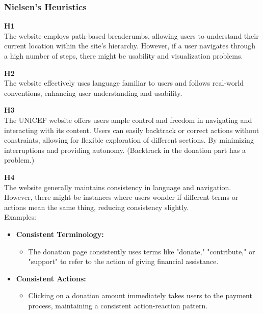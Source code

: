 \documentclass{article}
\begin{document}
\subsubsection{Nielsen's Heuristics}
\begin{description}
    \item {\textbf{H1} \color{unicefGray}{Visibility of system status}}\\
    The website employs path-based breadcrumbs, allowing users to understand their current location within the site's hierarchy. However, if a user navigates through a high number of steps, there might be usability and visualization problems.
    \item {\textbf{H2} \color{unicefGray}{Match between system and the real world}}\\
    The website effectively uses language familiar to users and follows real-world conventions, enhancing user understanding and usability.
    \item {\textbf{H3} \color{unicefGray}{User control and freedom}}\\
    The UNICEF website offers users ample control and freedom in navigating and interacting with its content. Users can easily backtrack or correct actions without constraints, allowing for flexible exploration of different sections. By minimizing interruptions and providing autonomy. (Backtrack in the donation part has a problem.)
    \item {\textbf{H4} \color{unicefGray}{Consistency and standards}}\\
    The website generally maintains consistency in language and navigation. However, there might be instances where users wonder if different terms or actions mean the same thing, reducing consistency slightly.\\
    Examples:
    \begin{itemize}
        \item \textbf{Consistent Terminology:}
        \begin{itemize}
            \item The donation page consistently uses terms like "donate," "contribute," or "support" to refer to the action of giving financial assistance.
        \end{itemize}
        \item \textbf{Consistent Actions:}
        \begin{itemize}
            \item Clicking on a donation amount immediately takes users to the payment process, maintaining a consistent action-reaction pattern.

\end{itemize}
\end{itemize}
\end{description}
\end{document}
